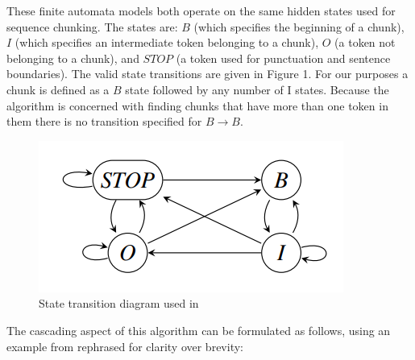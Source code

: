 \documentclass[11pt,a4paper]{article}
\begin{document}
These finite automata models both operate on the same hidden states used for sequence chunking.
The states are: $B$ (which specifies the beginning of a chunk), $I$ (which specifies an intermediate token belonging to a chunk), $O$ (a token not belonging to a chunk), and $STOP$ (a token used for punctuation and sentence boundaries).
The valid state transitions are given in Figure 1. For our purposes a chunk is defined as a $B$ state followed by any number of I states.
Because the algorithm is concerned with finding chunks that have more than one token in them there is no transition specified for $B \rightarrow B$.

\begin{figure}[h]
	\includegraphics[width=\linewidth]{figure1_state_diagram.png}
	\caption{\label{font-table} State transition diagram used in \citet{ponvert-etal-2011-simple} }
\end{figure}

The cascading aspect of this algorithm can be formulated as follows, using an example from \citet{ponvert-etal-2011-simple} rephrased for clarity over brevity:
\end{document}
